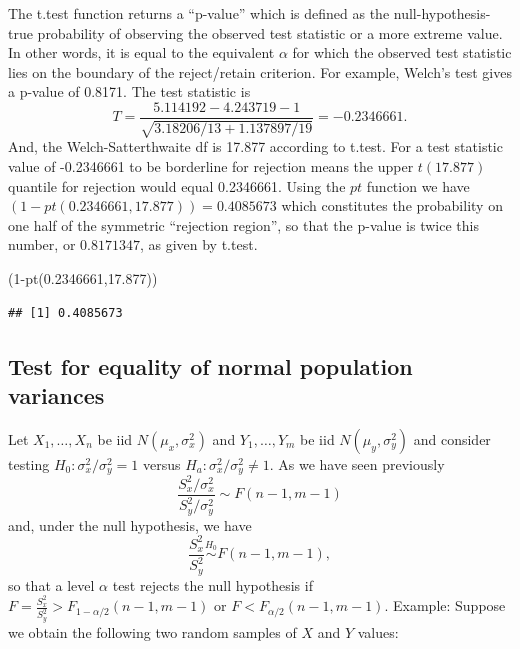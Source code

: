 \documentclass[
]{book}
\newenvironment{Shaded}{\begin{snugshade}}{\end{snugshade}}
\newcommand{\DecValTok}[1]{\textcolor[rgb]{0.00,0.00,0.81}{#1}}
\newcommand{\FloatTok}[1]{\textcolor[rgb]{0.00,0.00,0.81}{#1}}
\newcommand{\FunctionTok}[1]{\textcolor[rgb]{0.00,0.00,0.00}{#1}}
\newcommand{\NormalTok}[1]{#1}
\newcommand{\SpecialCharTok}[1]{\textcolor[rgb]{0.00,0.00,0.00}{#1}}
\begin{document}
The t.test function returns a ``p-value'' which is defined as the null-hypothesis-true probability of observing the observed test statistic or a more extreme value. In other words, it is equal to the equivalent \(\alpha\) for which the observed test statistic lies on the boundary of the reject/retain criterion. For example, Welch's test gives a p-value of 0.8171. The test statistic is
\[T = \frac{5.114192-4.243719-1}{\sqrt{3.18206/13 + 1.137897/19}}=-0.2346661.\]
And, the Welch-Satterthwaite df is 17.877 according to t.test. For a test statistic value of -0.2346661 to be borderline for rejection means the upper \(t(17.877)\) quantile for rejection would equal 0.2346661. Using the \(pt\) function we have \((1-pt(0.2346661,17.877)) = 0.4085673\) which constitutes the probability on one half of the symmetric ``rejection region'', so that the p-value is twice this number, or \(0.8171347\), as given by t.test.

\begin{Shaded}
\begin{Highlighting}[]
\NormalTok{(}\DecValTok{1}\SpecialCharTok{{-}}\FunctionTok{pt}\NormalTok{(}\FloatTok{0.2346661}\NormalTok{,}\FloatTok{17.877}\NormalTok{))}
\end{Highlighting}
\end{Shaded}

\begin{verbatim}
## [1] 0.4085673
\end{verbatim}

\hypertarget{test-for-equality-of-normal-population-variances}{%
\subsection{Test for equality of normal population variances}\label{test-for-equality-of-normal-population-variances}}

Let \(X_1, \ldots, X_n\) be iid \(N(\mu_x, \sigma_x^2)\) and \(Y_1, \ldots, Y_m\) be iid \(N(\mu_y, \sigma_y^2)\) and consider testing \(H_0:\sigma_x^2/\sigma_y^2 = 1\) versus \(H_a: \sigma_x^2/\sigma_y^2 \ne 1\). As we have seen previously
\[\frac{S_x^2/\sigma_x^2}{S_y^2/\sigma_y^2}\sim F(n-1, m-1)\]
and, under the null hypothesis, we have
\[\frac{S_x^2}{S_y^2}\stackrel{H_0}{\sim} F(n-1, m-1),\]
so that a level \(\alpha\) test rejects the null hypothesis if \(F = \frac{S_x^2}{S_y^2} > F_{1-\alpha/2}(n-1, m-1)\) or \(F < F_{\alpha/2}(n-1, m-1)\).
Example: Suppose we obtain the following two random samples of \(X\) and \(Y\) values:
\end{document}

